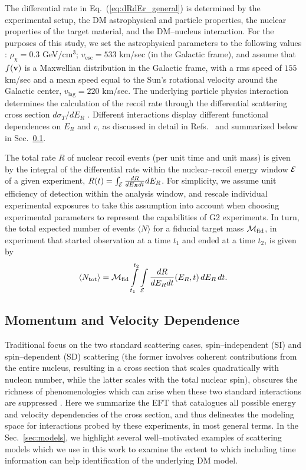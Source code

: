 \documentclass[11pt, a4paper]{article}
\newcommand{\beq}{\begin{equation}} \newcommand{\eeq}{\end{equation}}
\newcommand{\Eq}[1]{Eq.~(\ref{#1})} \newcommand{\Eqs}[2]{Eqs.~(\ref{#1}) and (\ref{#2})} \newcommand{\Eqm}[2]{Eqs.~(\ref{#1}) through (\ref{#2})}
\newcommand{\Sec}[1]{Sec.~\ref{#1}} \newcommand{\Secs}[2]{Secs.~\ref{#1} and \ref{#2}} \newcommand{\Secm}[2]{Secs.~\ref{#1} through \ref{#2}}
\begin{document}
The differential rate in \Eq{eq:dRdEr_general} is determined by the experimental setup, the DM astrophysical and particle properties, the nuclear properties of the target material, and the DM--nucleus interaction. For the purposes of this study, we set the astrophysical parameters to the following values \cite{Bovy:2013raa,Piffl:2013mla}: $\rho_\chi=0.3$ GeV/cm$^3$; $v_{\mathrm{esc}} = 533$ km/sec (in the Galactic frame), and assume that $f(\mathrm{\mbox{\bf{v}}})$ is a Maxwellian distribution in the Galactic frame, with a rms speed of $155$ km/sec and a mean speed equal to the Sun's rotational velocity around the Galactic center, $v_\textrm{lag}=220$ km/sec.
The underlying particle physics interaction determines the calculation of the recoil rate through the differential scattering cross section ${d\sigma_T}/{dE_R}$ \cite{Gluscevic:2015sqa,Gresham:2014vja}. Different interactions display different functional dependences on $E_R$ and $v$, as discussed in detail in Refs.~\cite{Gluscevic:2015sqa,Gresham:2014vja} and summarized below in \Sec{subsec:momentum_velocity}.

The total rate $R$ of nuclear recoil events (per unit time and unit mass) is given by the integral of the differential rate within the nuclear--recoil energy window ${\cal E}$ of a given experiment, $R(t)=\int_{\cal E} \frac{dR}{dE_R dt} dE_R$. For simplicity, we assume unit efficiency of detection within the analysis window, and rescale individual experimental exposures to take this assumption into account when choosing experimental parameters to represent the capabilities of G2 experiments. In turn, the total expected number of events $\langle N\rangle$ for a fiducial target mass ${\cal M}_\textrm{fid}$, in experiment that started observation at a time $t_1$ and ended at a time $t_2$, is given by
\beq \label{eq:totevents}
\langle N_\mathrm{tot}\rangle =  \cM_\textrm{fid} \int\limits_{t_1}^{t_2} \int\limits_\cE  \frac{dR}{dE_R dt}(E_R,t)\,dE_R \,dt.
\eeq


\subsection{Momentum and Velocity Dependence}
\label{subsec:momentum_velocity}

Traditional focus on the two standard scattering cases, spin--independent (SI) and spin--dependent (SD) scattering (the former involves coherent contributions from the entire nucleus, resulting in a cross section that scales quadratically with nucleon number, while the latter scales with the total nuclear spin), obscures the richness of phenomenologies which can arise when these two standard interactions are suppressed \cite{Fitzpatrick:2012ix,Gresham:2014vja}. Here we summarize the EFT that catalogues all possible energy and velocity dependencies of the cross section, and thus delineates the modeling space for interactions probed by these experiments, in most general terms. In the \Sec{sec:models}, we highlight several well--motivated examples of scattering models which we use in this work to examine the extent to which including time information can help identification of the underlying DM model.
\end{document}
